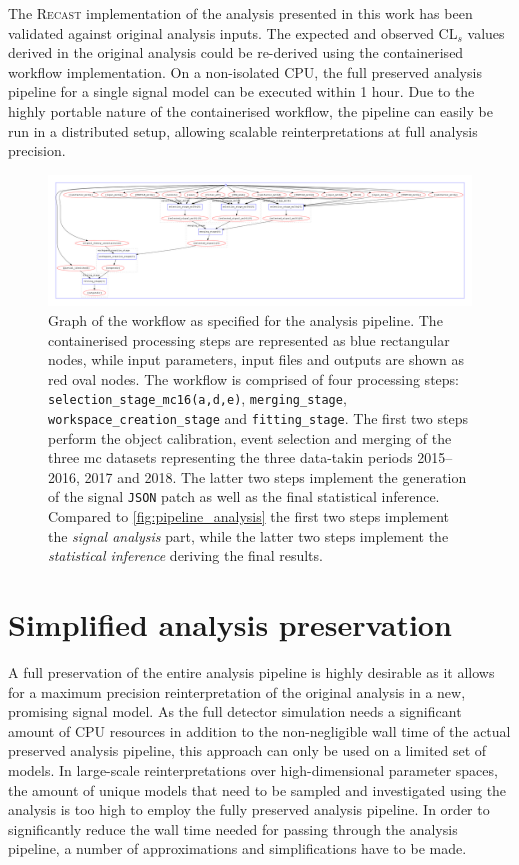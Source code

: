 The \textsc{Recast} implementation of the analysis presented in this work has been validated against original analysis inputs. The expected and observed CL$_s$ values derived in the original analysis could be re-derived using the containerised workflow implementation. On a non-isolated CPU, the full preserved analysis pipeline for a single signal model can be executed within 1 hour. Due to the highly portable nature of the containerised workflow, the pipeline can easily be run in a distributed setup, allowing scalable reinterpretations at full analysis precision. 


 \begin{figure}
	\centering\includegraphics[width=\textwidth]{yadage_workflow_instance}
	\caption{Graph of the workflow as specified for the analysis pipeline. The containerised processing steps are represented as blue rectangular nodes, while input parameters, input files and outputs are shown as red oval nodes. The workflow is comprised of four processing steps: \texttt{selection\_stage\_mc16(a,d,e)}, \texttt{merging\_stage}, \texttt{workspace\_creation\_stage} and \texttt{fitting\_stage}. The first two steps perform the object calibration, event selection and merging of the three \gls{mc} datasets representing the three data-takin periods 2015--2016, 2017 and 2018. The latter two steps implement the generation of the signal \texttt{JSON} patch as well as the final statistical inference. Compared to \cref{fig:pipeline_analysis} the first two steps implement the \textit{signal analysis} part, while the latter two steps implement the \textit{statistical inference} deriving the final results.} 
	\label{fig:recast_workflow}
\end{figure}

\section{Simplified analysis preservation}\label{sec:simplified_preservation}

A full preservation of the entire analysis pipeline is highly desirable as it allows for a maximum precision reinterpretation of the original analysis in a new, promising signal model. As the full detector simulation needs a significant amount of CPU resources in addition to the non-negligible wall time of the actual preserved analysis pipeline, this approach can only be used on a limited set of models. In large-scale reinterpretations over high-dimensional parameter spaces, the amount of unique models that need to be sampled and investigated using the analysis is too high to employ the fully preserved analysis pipeline. In order to significantly reduce the wall time needed for passing through the analysis pipeline, a number of approximations and simplifications have to be made. 

